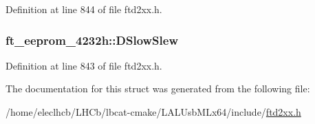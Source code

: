 Definition at line 844 of file ftd2xx.h.\hypertarget{structft__eeprom__4232h_ae32b979b9db358e8b6613e41ed201110}{
\subsubsection[{DSlowSlew}]{ {\bf ft\_\-eeprom\_\-4232h::DSlowSlew}}}
\label{structft__eeprom__4232h_ae32b979b9db358e8b6613e41ed201110}


Definition at line 843 of file ftd2xx.h.

The documentation for this struct was generated from the following file:\begin{DoxyCompactItemize}
\item 
/home/eleclhcb/LHCb/lbcat-\/cmake/LALUsbMLx64/include/\hyperlink{LALUsbMLx64_2include_2ftd2xx_8h}{ftd2xx.h}\end{DoxyCompactItemize}
